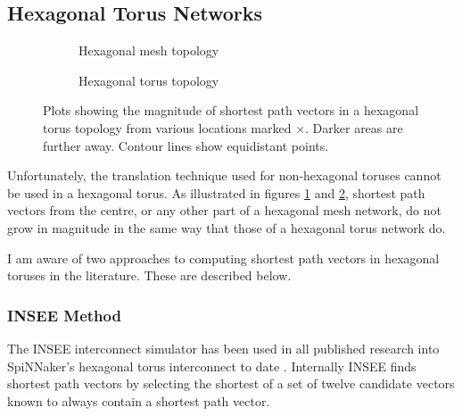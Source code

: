 		\subsection{Hexagonal Torus Networks}
			
			\begin{figure}
				\center
				
				\begin{subfigure}{\linewidth}
					\center
					\caption{Hexagonal mesh topology}
					\label{fig:distance-map-hex-mesh}
				\end{subfigure}
				
				\vspace{1em}
				
				\begin{subfigure}{\linewidth}
					\center
					\caption{Hexagonal torus topology}
					\label{fig:distance-map-hex-torus}
				\end{subfigure}
				
				\caption{Plots showing the magnitude of shortest path vectors in a
				hexagonal torus topology from various locations marked
				{\color{red}$\times$}.  Darker areas are further away. Contour lines show
				equidistant points.}
				
				\label{fig:distance-map-hex}
			\end{figure}
			
			Unfortunately, the translation technique used for non-hexagonal toruses
			cannot be used in a hexagonal torus. As illustrated in figures
			\ref{fig:distance-map-hex-mesh} and \ref{fig:distance-map-hex-torus},
			shortest path vectors from the centre, or any other part of a hexagonal
			mesh network, do not grow in magnitude in the same way that those of a
			hexagonal torus network do.
			
			I am aware of two approaches to computing shortest path vectors in
			hexagonal toruses in the literature. These are described below.
			
			\subsubsection{INSEE Method}
			
				The INSEE interconnect simulator has been used in all published research
				into SpiNNaker's hexagonal torus interconnect to date
				\cite{navaridas09,ghasempour15}. Internally INSEE finds shortest path
				vectors by selecting the shortest of a set of twelve candidate vectors
				known to always contain a shortest path vector.
				
